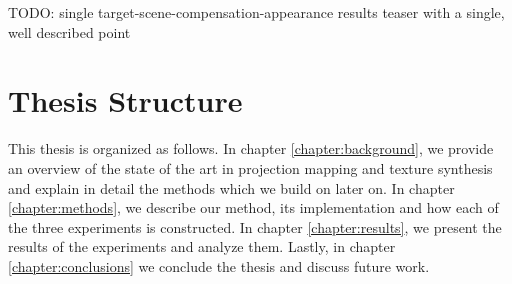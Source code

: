 {\color{red} TODO: single target-scene-compensation-appearance results teaser with a single, well described point}

\section{Thesis Structure}
\label{section:intro-thesis_structure}

This thesis is organized as follows. In chapter \ref{chapter:background}, we provide an overview of the state of the art in projection mapping and texture synthesis and explain in detail the methods which we build on later on. In chapter \ref{chapter:methods}, we describe our method, its implementation and how each of the three experiments is constructed. In chapter \ref{chapter:results}, we present the results of the experiments and analyze them. Lastly, in chapter \ref{chapter:conclusions} we conclude the thesis and discuss future work.
